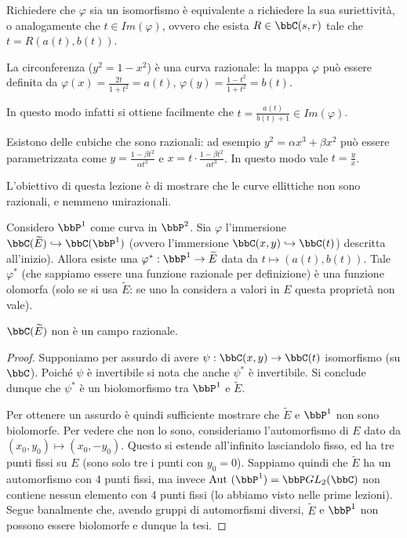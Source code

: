 Richiedere che $\varphi$ sia un isomorfismo è equivalente a richiedere la sua suriettività, o analogamente che $t\in Im(\varphi)$, ovvero che esista $R\in \bbC(s,r)$ tale che $t=R(a(t),b(t))$.
\begin{osservazione}
La circonferenza ($y^2=1-x^2$) è una curva razionale: la mappa $\varphi$ può essere definita da $\varphi(x)=\frac{2t}{1+t^2}=a(t)$, $\varphi(y)=\frac{1-t^2}{1+t^2}=b(t)$.

In questo modo infatti si ottiene facilmente che $t=\frac{a(t)}{b(t)+1}\in Im(\varphi)$.
\end{osservazione}
\begin{osservazione}
Esistono delle cubiche che sono razionali: ad esempio $y^2=\alpha x^3 + \beta x^2$ può essere parametrizzata come $y=\frac{1-\beta t^2}{\alpha t^3}$ e $x=t\cdot\frac{1-\beta t^2}{\alpha t^3}$.
In questo modo vale $t=\frac{y}{x}$.
\end{osservazione}

L'obiettivo di questa lezione è di mostrare che le curve ellittiche non sono razionali, e nemmeno unirazionali.

\begin{fatto}
Considero $\bbP^1$ come curva in $\bbP^2$. Sia $\varphi$ l'immersione $\bbC(\widetilde{E})\hookrightarrow\bbC(\bbP^1)$ (ovvero l'immersione $\bbC(x,y)\hookrightarrow\bbC(t)$) descritta all'inizio).
Allora esiste una $\varphi^*:\bbP^1\rightarrow\widetilde{E}$ data da $t\mapsto (a(t),b(t))$.
Tale $\varphi^*$ (che sappiamo essere una funzione razionale per definizione) è una funzione olomorfa (solo se si usa $\widetilde{E}$: se uno la considera a valori in $E$ questa proprietà non vale).
\end{fatto}

\begin{teorema}
$\bbC(\widetilde{E})$ non è un campo razionale.
\end{teorema}

\begin{proof}
Supponiamo per assurdo di avere $\psi:\bbC(x,y)\rightarrow\bbC(t)$ isomorfismo (su $\bbC$). Poiché $\psi$ è invertibile si nota che anche $\psi^*$ è invertibile. Si conclude dunque che $\psi^*$ è un biolomorfismo tra $\bbP^1$ e $\widetilde{E}$.

Per ottenere un assurdo è quindi sufficiente mostrare che $\widetilde{E}$ e $\bbP^1$ non sono biolomorfe. Per vedere che non lo sono, consideriamo l'automorfismo di $E$ dato da $(x_0,y_0)\mapsto(x_0,-y_0)$. Questo si estende all'infinito lasciandolo fisso, ed ha tre punti fissi su $E$ (sono solo tre i punti con $y_0=0$). Sappiamo quindi che $\widetilde{E}$ ha un automorfismo con $4$ punti fissi, ma invece $\Aut(\bbP^1)=\bbP GL_2(\bbC)$ non contiene nessun elemento con 4 punti fissi (lo abbiamo visto nelle prime lezioni). Segue banalmente che, avendo gruppi di automorfismi diversi, $\widetilde{E}$ e $\bbP^1$ non possono essere biolomorfe e dunque la tesi.
\end{proof}

